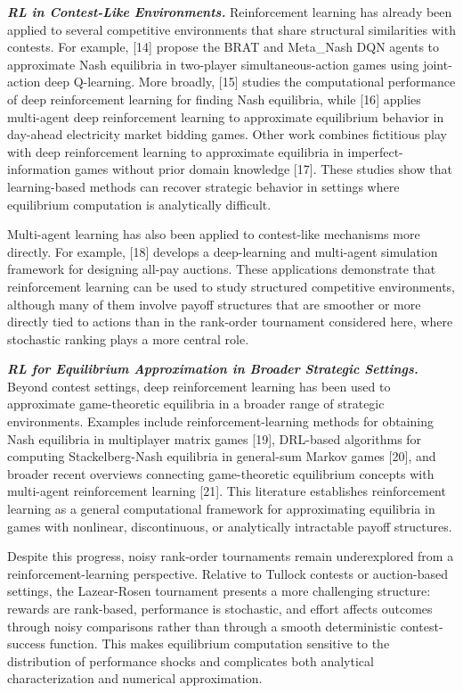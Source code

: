 \documentclass[
]{article}
\begin{document}
\emph{\textbf{RL in Contest-Like Environments.}} Reinforcement learning
has already been applied to several competitive environments that share
structural similarities with contests. For example, {[}14{]} propose the
BRAT and Meta\_Nash DQN agents to approximate Nash equilibria in
two-player simultaneous-action games using joint-action deep Q-learning.
More broadly, {[}15{]} studies the computational performance of deep
reinforcement learning for finding Nash equilibria, while {[}16{]}
applies multi-agent deep reinforcement learning to approximate
equilibrium behavior in day-ahead electricity market bidding games.
Other work combines fictitious play with deep reinforcement learning to
approximate equilibria in imperfect-information games without prior
domain knowledge {[}17{]}. These studies show that learning-based
methods can recover strategic behavior in settings where equilibrium
computation is analytically difficult.

Multi-agent learning has also been applied to contest-like mechanisms
more directly. For example, {[}18{]} develops a deep-learning and
multi-agent simulation framework for designing all-pay auctions. These
applications demonstrate that reinforcement learning can be used to
study structured competitive environments, although many of them involve
payoff structures that are smoother or more directly tied to actions
than in the rank-order tournament considered here, where stochastic
ranking plays a more central role.

\emph{\textbf{RL for Equilibrium Approximation in Broader Strategic
Settings.}} Beyond contest settings, deep reinforcement learning has
been used to approximate game-theoretic equilibria in a broader range of
strategic environments. Examples include reinforcement-learning methods
for obtaining Nash equilibria in multiplayer matrix games {[}19{]},
DRL-based algorithms for computing Stackelberg-Nash equilibria in
general-sum Markov games {[}20{]}, and broader recent overviews
connecting game-theoretic equilibrium concepts with multi-agent
reinforcement learning {[}21{]}. This literature establishes
reinforcement learning as a general computational framework for
approximating equilibria in games with nonlinear, discontinuous, or
analytically intractable payoff structures.

Despite this progress, noisy rank-order tournaments remain underexplored
from a reinforcement-learning perspective. Relative to Tullock contests
or auction-based settings, the Lazear-Rosen tournament presents a more
challenging structure: rewards are rank-based, performance is
stochastic, and effort affects outcomes through noisy comparisons rather
than through a smooth deterministic contest-success function. This makes
equilibrium computation sensitive to the distribution of performance
shocks and complicates both analytical characterization and numerical
approximation.
\end{document}
